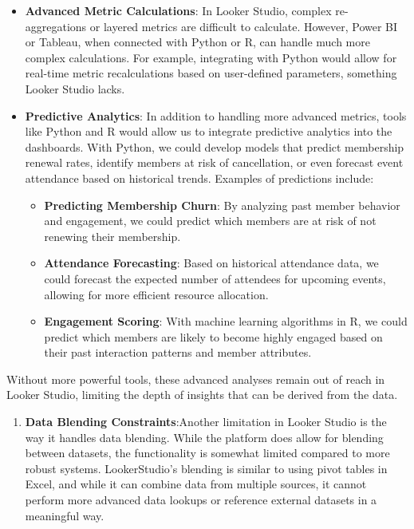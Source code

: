 \documentclass[11pt,a4paper,]{article}
\providecommand{\tightlist}{%
  \setlength{\itemsep}{0pt}\setlength{\parskip}{0pt}}
\begin{document}
\begin{itemize}
\item
  \textbf{Advanced Metric Calculations}: In Looker Studio, complex re-aggregations or layered metrics are difficult to calculate. However, Power BI or Tableau, when connected with Python or R, can handle much more complex calculations. For example, integrating with Python would allow for real-time metric recalculations based on user-defined parameters, something Looker Studio lacks.
\item
  \textbf{Predictive Analytics}: In addition to handling more advanced metrics, tools like Python and R would allow us to integrate predictive analytics into the dashboards. With Python, we could develop models that predict membership renewal rates, identify members at risk of cancellation, or even forecast event attendance based on historical trends. Examples of predictions include:

  \begin{itemize}
  \item
    \textbf{Predicting Membership Churn}: By analyzing past member behavior and engagement, we could predict which members are at risk of not renewing their membership.
  \item
    \textbf{Attendance Forecasting}: Based on historical attendance data, we could forecast the expected number of attendees for upcoming events, allowing for more efficient resource allocation.
  \item
    \textbf{Engagement Scoring}: With machine learning algorithms in R, we could predict which members are likely to become highly engaged based on their past interaction patterns and member attributes.
  \end{itemize}
\end{itemize}

Without more powerful tools, these advanced analyses remain out of reach in Looker Studio, limiting the depth of insights that can be derived from the data.

\begin{enumerate}
\def\labelenumi{\arabic{enumi}.}
\setcounter{enumi}{1}
\tightlist
\item
  \textbf{Data Blending Constraints}:Another limitation in Looker Studio is the way it handles data blending. While the platform does allow for blending between datasets, the functionality is somewhat limited compared to more robust systems. LookerStudio's blending is similar to using pivot tables in Excel, and while it can combine data from multiple sources, it cannot perform more advanced data lookups or reference external datasets in a meaningful way.
\end{enumerate}
\end{document}
